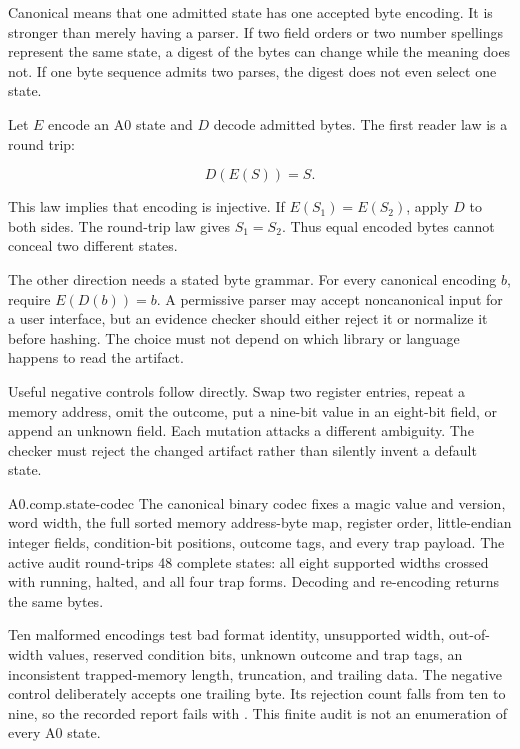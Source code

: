 Canonical means that one admitted state has one accepted byte encoding. It is
stronger than merely having a parser. If two field orders or two number
spellings represent the same state, a digest of the bytes can change while the
meaning does not. If one byte sequence admits two parses, the digest does not
even select one state.

Let \(E\) encode an A0 state and \(D\) decode admitted bytes. The first reader
law is a round trip:

\[
D(E(S))=S.
\]

This law implies that encoding is injective. If \(E(S_1)=E(S_2)\), apply
\(D\) to both sides. The round-trip law gives \(S_1=S_2\). Thus equal encoded
bytes cannot conceal two different states.

The other direction needs a stated byte grammar. For every canonical encoding
\(b\), require \(E(D(b))=b\). A permissive parser may accept noncanonical
input for a user interface, but an evidence checker should either reject it or
normalize it before hashing. The choice must not depend on which library or
language happens to read the artifact.

Useful negative controls follow directly. Swap two register entries, repeat a
memory address, omit the outcome, put a nine-bit value in an eight-bit field,
or append an unknown field. Each mutation attacks a different ambiguity. The
checker must reject the changed artifact rather than silently invent a default
state.

\begin{artifact}{A0.comp.state-codec}
The canonical binary codec fixes a magic value and version, word width, the
full sorted memory address-byte map, register order, little-endian integer fields,
condition-bit positions, outcome tags, and every trap payload. The active
audit round-trips 48 complete states: all eight supported widths crossed with
running, halted, and all four trap forms. Decoding and re-encoding returns the
same bytes.

Ten malformed encodings test bad format identity, unsupported width,
out-of-width values, reserved condition bits, unknown outcome and trap tags,
an inconsistent trapped-memory length, truncation, and trailing data. The
negative control deliberately accepts one trailing byte. Its rejection count
falls from ten to nine, so the recorded report fails with
. This finite audit is not an enumeration of every A0
state.
\end{artifact}


